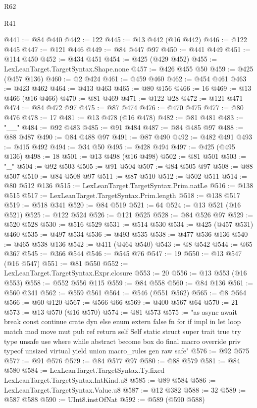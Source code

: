 \begin{lexlean}{R62}
\begin{lexlean}{R41}
\begin{coremodule}
{{{{{{{{{{{{{{{{{{{{{{{{{{{{{{{{{{{{{{{{{{{{{{{{{{{{{{{{{{{{{{{{{{{{{{{{{{{{{{{{{{{{{{{@441 := @84 @440
@442 := 122
@445 := @13 @442 (@16 @442)
@446 := @122 @445
@447 := @121 @446
@449 := @84 @447 @97
@450 := @441 @449
@451 := @114 @450
@452 := @434 @451
@454 := @425 (@429 @452)
@455 := LexLeanTarget.TargetSyntax.Shape.none
@457 := @426 @455 @50
@459 := @425 (@457 @136)
@460 := @2 @424
@461 := @459 @460
@462 := @454 @461
@463 := @423 @462
@464 := @413 @463
@465 := @80 @156
@466 := 16
@469 := @13 @466 (@16 @466)
@470 := @81 @469
@471 := @122 @28
@472 := @121 @471
@474 := @84 @472 @97
@475 := @87 @474
@476 := @470 @475
@477 := @80 @476
@478 := 17
@481 := @13 @478 (@16 @478)
@482 := @81 @481
@483 := "__"
@484 := @92 @483
@485 := @91 @484
@487 := @84 @485 @97
@488 := @88 @487
@490 := @84 @488 @97
@491 := @87 @490
@492 := @482 @491
@493 := @415 @492
@494 := @34 @50
@495 := @428 @494
@497 := @425 (@495 @136)
@498 := 18
@501 := @13 @498 (@16 @498)
@502 := @81 @501
@503 := "_"
@504 := @92 @503
@505 := @91 @504
@507 := @84 @505 @97
@508 := @88 @507
@510 := @84 @508 @97
@511 := @87 @510
@512 := @502 @511
@514 := @80 @512 @136
@515 := LexLeanTarget.TargetSyntax.Prim.natLe
@516 := @138 @515
@517 := LexLeanTarget.TargetSyntax.Prim.length
@518 := @138 @517
@519 := @518 @341
@520 := @84 @519
@521 := 64
@524 := @13 @521 (@16 @521)
@525 := @122 @524
@526 := @121 @525
@528 := @84 @526 @97
@529 := @520 @528
@530 := @516 @529
@531 := @514 @530
@534 := @425 (@457 @531) @460
@535 := @497 @534
@536 := @493 @535
@538 := @477 @536 @136
@540 := @465 @538 @136
@542 := @411 (@464 @540)
@543 := @8 @542
@544 := @65 @367
@545 := @366 @544
@546 := @545 @76
@547 := 19
@550 := @13 @547 (@16 @547)
@551 := @81 @550
@552 := LexLeanTarget.TargetSyntax.Expr.closure
@553 := 20
@556 := @13 @553 (@16 @553)
@558 := @552 @556 @115
@559 := @84 @558
@560 := @84 @136
@561 := @560 @341
@562 := @559 @561
@564 := @546 (@551 @562)
@565 := @8 @564
@566 := @60 @120
@567 := @566 @66
@569 := @400 @567 @64
@570 := 21
@573 := @13 @570 (@16 @570)
@574 := @81 @573
@575 := "as async await break const continue crate dyn else enum extern false fn for if impl in let loop match mod move mut pub ref return self Self static struct super trait true try type unsafe use where while abstract become box do final macro override priv typeof unsized virtual yield union macro_rules gen raw safe"
@576 := @92 @575
@577 := @91 @576
@579 := @84 @577 @97
@580 := @88 @579
@581 := @84 @580
@584 := LexLeanTarget.TargetSyntax.Ty.fixed LexLeanTarget.TargetSyntax.IntKind.u8
@585 := @89 @584
@586 := LexLeanTarget.TargetSyntax.Value.u8
@587 := @12 @382
@588 := 32
@589 := @587 @588
@590 := UInt8.instOfNat
@592 := @589 (@590 @588)
}}}}}}}}}}}}}}}}}}}}}}}}}}}}}}}}}}}}}}}}}}}}}}}}}}}}}}}}}}}}}}}}}}}}}}}}}}}}}}}}}}}}}}}
\end{coremodule}
\end{lexlean}
\end{lexlean}
